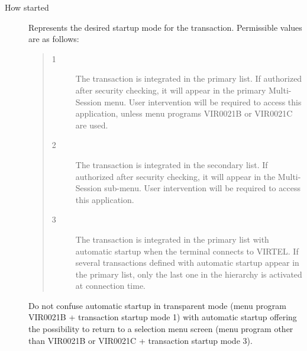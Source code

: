 \documentclass[letterpaper,10pt,english]{sphinxmanual}
\begin{document}
\begin{description}
\item[{How started}] \leavevmode
Represents the desired startup mode for the transaction. Permissible values are as follows:
\begin{quote}
\begin{description}
\item[{1}] \leavevmode
The transaction is integrated in the primary list. If authorized after security checking, it will appear in the primary Multi-Session menu. User intervention will be required to access this application, unless menu programs VIR0021B or VIR0021C are used.

\item[{2}] \leavevmode
The transaction is integrated in the secondary list. If authorized after security checking, it will appear in the Multi-Session sub-menu. User intervention will be required to access this application.

\item[{3}] \leavevmode
The transaction is integrated in the primary list with automatic startup when the terminal connects to VIRTEL. If several transactions defined with automatic startup appear in the primary list, only the last one in the hierarchy is activated at connection time.

\end{description}
\end{quote}

Do not confuse automatic startup in transparent mode (menu program VIR0021B + transaction startup mode 1) with automatic startup offering the possibility to return to a selection menu screen (menu program other than VIR0021B or VIR0021C + transaction startup mode 3).

\end{description}
\end{document}
